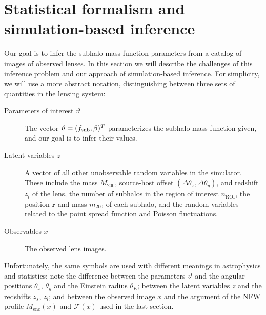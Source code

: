 \documentclass[twocolumn]{aastex63}
\begin{document}
\section{Statistical formalism and simulation-based inference}
\label{sec:lfi-formalism}
%
Our goal is to infer the subhalo mass function parameters from a catalog of images of observed lenses. In this section we will describe the challenges of this inference problem and our approach of simulation-based inference. For simplicity, we will use a more abstract notation, distinguishing between three sets of quantities in the lensing system:
%
\begin{description}
  \item[Parameters of interest $\vartheta$] The vector $\vartheta = (f_{\mathrm{sub}}, \beta)^T$ parameterizes the subhalo mass function given, and our goal is to infer their values.
  \item[Latent variables $z$] A vector of all other unobservable random variables in the simulator. These include the mass $M_{200}$, source-host offset $(\Delta\theta_x, \Delta\theta_y)$, and redshift $z_l$ of the lens, the number of subhalos in the region of interest $n_\mathrm{ROI}$, the position $\mathbf{r}$ and mass $m_{200}$ of each subhalo, and the random variables related to the point spread function and Poisson fluctuations.
  \item[Observables $x$] The observed lens images.
\end{description}
%
Unfortunately, the same symbols are used with different meanings in astrophysics and statistics: note the difference between the parameters $\vartheta$ and the angular positions $\theta_x$, $\theta_y$ and the Einstein radius $\theta_E$; between the latent variables $z$ and the redshifts $z_s$, $z_l$; and between the observed image $x$ and the argument of the NFW profile $M_\mathrm{enc}(x)$ and $\mathcal F(x)$ used in the last section.
\end{document}
